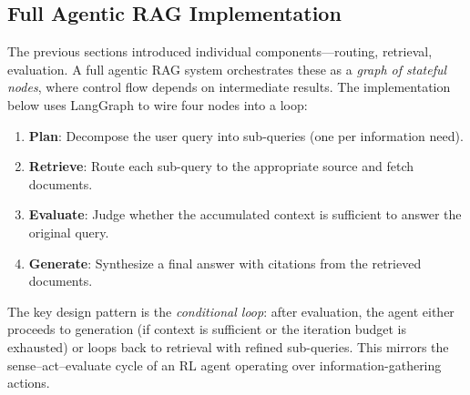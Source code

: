 \subsection{Full Agentic RAG Implementation}
\label{full-agentic-rag-implementation}

The previous sections introduced individual components---routing, retrieval, evaluation. A full agentic RAG system orchestrates these as a \emph{graph of stateful nodes}, where control flow depends on intermediate results. The implementation below uses LangGraph to wire four nodes into a loop:

\begin{enumerate}
  \item \textbf{Plan}: Decompose the user query into sub-queries (one per information need).
  \item \textbf{Retrieve}: Route each sub-query to the appropriate source and fetch documents.
  \item \textbf{Evaluate}: Judge whether the accumulated context is sufficient to answer the original query.
  \item \textbf{Generate}: Synthesize a final answer with citations from the retrieved documents.
\end{enumerate}

The key design pattern is the \emph{conditional loop}: after evaluation, the agent either proceeds to generation (if context is sufficient or the iteration budget is exhausted) or loops back to retrieval with refined sub-queries. This mirrors the sense--act--evaluate cycle of an RL agent operating over information-gathering actions.

